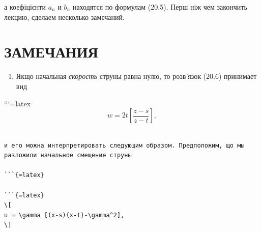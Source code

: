 \documentclass[
  ukrainian,
]{article}
\providecommand{\tightlist}{%
  \setlength{\itemsep}{0pt}\setlength{\parskip}{0pt}}
\begin{document}
а коефіцієнти \(a_n\) и \(b_n\) находятся по формулам (20.5). Перш ніж
чем закончить лекцию, сделаем несколько замечаний.

\section{ЗАМЕЧАНИЯ}\label{ux437ux430ux43cux435ux447ux430ux43dux438ux44f-2}

\begin{enumerate}
\def\labelenumi{\arabic{enumi}.}
\tightlist
\item
  Якщо начальная \emph{скорость} струны равна нулю, то розв'язок (20.6)
  принимает вид
\end{enumerate}

```{=latex}
\[
w = 2t \left[ \frac{z-s}{z-t} \right],
\]

\begin{verbatim}

и его можна интерпретировать следующим образом. Предположим, що мы разложили начальное смещение струны

```{=latex}

```{=latex}
\[
u = \gamma [(x-s)(x-t)-\gamma^2],
\]
\end{verbatim}
\end{document}
